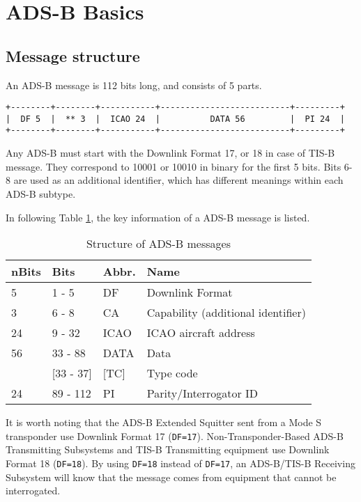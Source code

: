 \section{ADS-B Basics}\label{introduction}

\subsection{Message structure}\label{message-structure}

An ADS-B message is 112 bits long, and consists of 5 parts.

\begin{verbatim}
+--------+--------+-----------+--------------------------+---------+
|  DF 5  |  ** 3  |  ICAO 24  |          DATA 56         |  PI 24  |
+--------+--------+-----------+--------------------------+---------+
\end{verbatim}

Any ADS-B must start with the Downlink Format 17, or 18 in case of TIS-B message. They correspond to 10001 or 10010 in binary for the first 5 bits. Bits 6-8 are used as an additional identifier, which has different meanings within each ADS-B subtype.

In following Table \ref{tb:adsb-structure}, the key information of a ADS-B message is listed.

\begin{table}[!ht]
\centering
\begin{tabular}{@{}llll@{}}
\toprule
nBits & Bits & Abbr. & Name \\ \midrule
5 & 1 - 5 & DF & Downlink Format \\
3 & 6 - 8 & CA & Capability (additional identifier) \\
24 & 9 - 32 & ICAO & ICAO aircraft address \\
56 & 33 - 88 & DATA & Data \\
 & {[}33 - 37{]} & {[}TC{]} & Type code \\
24 & 89 - 112 & PI & Parity/Interrogator ID \\ \bottomrule
\end{tabular}
\caption{Structure of ADS-B messages}
\label{tb:adsb-structure}
\end{table}

It is worth noting that the ADS-B Extended Squitter sent from a Mode S transponder use Downlink Format 17 (\texttt{DF=17}). Non-Transponder-Based ADS-B Transmitting Subsystems and TIS-B Transmitting equipment use Downlink Format 18 (\texttt{DF=18}). By using \texttt{DF=18} instead of \texttt{DF=17}, an ADS-B/TIS-B Receiving Subsystem will know that the message comes from equipment that cannot be interrogated.

